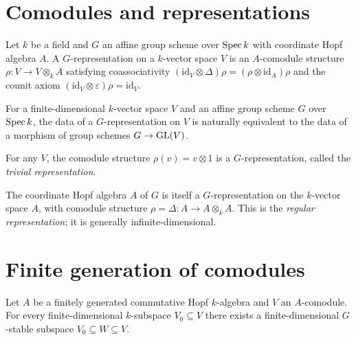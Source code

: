 \section{Comodules and representations}

\begin{definition}
  \label{def:G-representation}
Let $k$ be a field and $G$ an affine group scheme over $\operatorname{Spec} k$ with
coordinate Hopf algebra $A$. A $G$-representation on a $k$-vector space
$V$ is an $A$-comodule structure $\rho : V \to V \otimes_k A$ satisfying
coassociativity $(\mathrm{id}_V \otimes \Delta)\rho = (\rho \otimes \mathrm{id}_A)\rho$
and the counit axiom $(\mathrm{id}_V \otimes \varepsilon)\rho = \mathrm{id}_V$.
\end{definition}

\begin{theorem}
  \label{thm:repn-vs-hom}
For a finite-dimensional $k$-vector space $V$ and an affine group scheme
$G$ over $\operatorname{Spec} k$, the data of a $G$-representation on $V$ is naturally
equivalent to the data of a morphism of group schemes $G \to \mathrm{GL}(V)$.
\end{theorem}

\begin{example}\label{ex:trivial-repn}
For any $V$, the comodule structure $\rho(v) = v \otimes 1$ is a
$G$-representation, called the \emph{trivial representation}.
\end{example}

\begin{example}\label{ex:regular-repn}
The coordinate Hopf algebra $A$ of $G$ is itself a $G$-representation on
the $k$-vector space $A$, with comodule structure
$\rho = \Delta : A \to A \otimes_k A$. This is the \emph{regular
representation}; it is generally infinite-dimensional.
\end{example}

\section{Finite generation of comodules}

\begin{lemma}
  \label{lem:fg-comodule}
Let $A$ be a finitely generated commutative Hopf $k$-algebra and $V$ an
$A$-comodule. For every finite-dimensional $k$-subspace $V_0 \subseteq V$
there exists a finite-dimensional $G$-stable subspace
$V_0 \subseteq W \subseteq V$.
\end{lemma}

